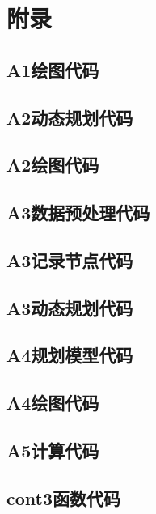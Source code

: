 \documentclass{ctexart}
\begin{document}
\section*{附录}
\subsection*{A1绘图代码}

\subsection*{A2动态规划代码}

\subsection*{A2绘图代码}

\subsection*{A3数据预处理代码}

\subsection*{A3记录节点代码}

\subsection*{A3动态规划代码}

\subsection*{A4规划模型代码}

\subsection*{A4绘图代码}

\subsection*{A5计算代码}

\subsection*{cont3函数代码}

\end{document}
